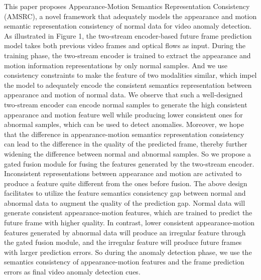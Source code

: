 \documentclass[sigconf]{acmart}
\begin{document}
This paper proposes Appearance-Motion Semantics Representation Consistency (AMSRC), a novel framework that adequately models the appearance and motion semantic representation consistency of normal data for video anomaly detection. As illustrated in Figure 1, the two-stream encoder-based future frame prediction model takes both previous video frames and optical flows as input. During the training phase, the two-stream encoder is trained to extract the appearance and motion information representations by only normal samples. And we use consistency constraints to make the feature of two modalities similar, which impel the model to adequately encode the consistent semantics representation between appearance and motion of normal data. We observe that such a well-designed two-stream encoder can encode normal samples to generate the high consistent appearance and motion feature well while producing lower consistent ones for abnormal samples, which can be used to detect anomalies. Moreover, we hope that the difference in appearance-motion semantics representation consistency can lead to the difference in the quality of the predicted frame, thereby further widening the difference between normal and abnormal samples. So we propose a gated fusion module for fusing the features generated by the two-stream encoder. Inconsistent representations between appearance and motion are activated to produce a feature quite different from the ones before fusion. The above design facilitates to utilize the feature semantics consistency gap between normal and abnormal data to augment the quality of the prediction gap. Normal data will generate consistent appearance-motion features, which are trained to predict the future frame with higher quality. In contrast, lower consistent appearance-motion features generated by abnormal data will produce an irregular feature through the gated fusion module, and the irregular feature will produce future frames with larger prediction errors. So during the anomaly detection phase, we use the semantics consistency of appearance-motion features and the frame prediction errors as final video anomaly detection cues.
  
\end{document}

